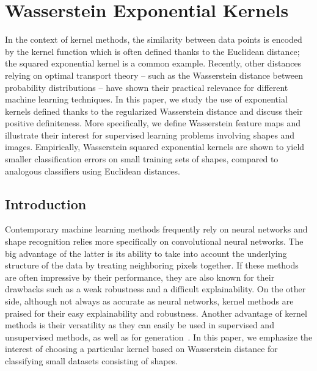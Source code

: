 \chapter{Wasserstein Exponential Kernels}\label{cha:wasskernels}

In the context of kernel methods, the similarity between data points is encoded by the kernel function which is often defined thanks to the Euclidean distance; the squared exponential kernel is a common example. Recently, other distances relying on optimal transport theory -- such as the Wasserstein distance between probability distributions -- have shown their practical relevance for different machine learning techniques. In this paper, we study the use of exponential kernels defined thanks to the regularized Wasserstein distance and discuss their positive definiteness. More specifically, we define Wasserstein feature maps and illustrate their interest for supervised learning problems involving shapes and images. Empirically, Wasserstein squared exponential kernels are shown to yield smaller classification errors on small training sets of shapes, compared to analogous classifiers using Euclidean distances.

\section{Introduction}
Contemporary machine learning methods frequently rely on neural networks and shape recognition relies more specifically on convolutional neural networks. The big advantage of the latter is its ability to take into account the underlying structure of the data by treating neighboring pixels together. If these methods are often impressive by their performance, they are also known for their drawbacks such as a weak robustness and a difficult explainability. On the other side, although not always as accurate as neural networks, kernel methods are praised for their easy explainability and robustness. Another advantage of kernel methods is their versatility as they can easily be used in supervised and unsupervised methods, as well as for generation~\cite{GenRKM}. In this paper, we emphasize the interest of choosing a particular kernel based on Wasserstein distance for classifying small datasets consisting of shapes.

